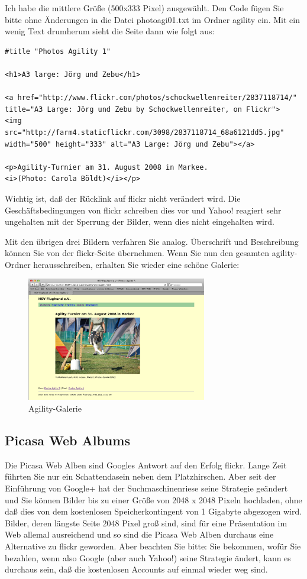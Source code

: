 \documentclass[11pt]{report}
\begin{document}
Ich habe die mittlere Größe (500x333 Pixel) ausgewählt. Den Code fügen
Sie bitte ohne Änderungen in die Datei photoagi01.txt im Ordner
agility ein. Mit ein wenig Text drumherum sieht die Seite dann wie
folgt aus:


\begin{verbatim}
#title "Photos Agility 1"

<h1>A3 large: Jörg und Zebu</h1>

<a href="http://www.flickr.com/photos/schockwellenreiter/2837118714/" 
title="A3 Large: Jörg und Zebu by Schockwellenreiter, on Flickr">
<img src="http://farm4.staticflickr.com/3098/2837118714_68a6121dd5.jpg" 
width="500" height="333" alt="A3 Large: Jörg und Zebu"></a>

<p>Agility-Turnier am 31. August 2008 in Markee.
<i>(Photo: Carola Böldt)</i></p>
\end{verbatim}

Wichtig ist, daß der Rücklink auf flickr nicht verändert wird. Die
Geschäftsbedingungen von flickr schreiben dies vor und Yahoo! reagiert
sehr ungehalten mit der Sperrung der Bilder, wenn dies nicht
eingehalten wird.


Mit den übrigen drei Bildern verfahren Sie analog. Überschrift und
Beschreibung können Sie von der flickr-Seite übernehmen. Wenn Sie nun
den gesamten agility-Ordner herausschreiben, erhalten Sie wieder eine
schöne Galerie:

\begin{figure}[h!]
\centering
\includegraphics[width=0.7\textwidth]{./images/galerie07.png}
\caption{\label{galerie07}Agility-Galerie}
\end{figure}
\subsection{Picasa Web Albums}
\label{sec-2-4-1-2}


Die Picasa Web Alben sind Googles Antwort auf den Erfolg flickr. Lange
Zeit führten Sie nur ein Schattendasein neben dem Platzhirschen. Aber
seit der Einführung von Google+ hat der Suchmaschinenriese seine
Strategie geändert und Sie können Bilder bis zu einer Größe von 2048 x
2048 Pixeln hochladen, ohne daß dies von dem kostenlosen
Speicherkontingent von 1 Gigabyte abgezogen wird. Bilder, deren
längste Seite 2048 Pixel groß sind, sind für eine Präsentation im Web
allemal ausreichend und so sind die Picasa Web Alben durchaus eine
Alternative zu flickr geworden. Aber beachten Sie bitte: Sie bekommen,
wofür Sie bezahlen, wenn also Google (aber auch Yahoo!) seine
Strategie ändert, kann es durchaus sein, daß die kostenlosen Accounts
auf einmal wieder weg sind.
\end{document}
